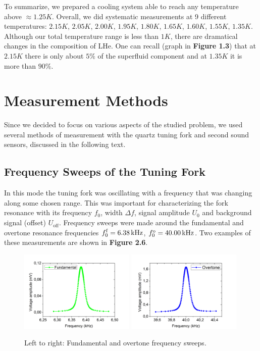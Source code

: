 To summarize, we prepared a cooling system able to reach any temperature above $ \approx 1.25\unit{K} $. Overall, we did systematic measurements at 9 different temperatures: $ 2.15\unit{K} $, $ 2.05\unit{K} $, $ 2.00\unit{K} $, $ 1.95\unit{K} $, $ 1.80\unit{K} $, $ 1.65\unit{K} $, $ 1.60\unit{K} $, $ 1.55\unit{K} $, $ 1.35\unit{K}$. Although our total temperature range is less than $ 1\unit{K} $, there are dramatical changes in the composition of LHe. One can recall (graph in {\sffamily\textbf{Figure 1.3}}) that at $ 2.15\unit{K} $ there is only about $ 5\% $ of the superfluid component and at $ 1.35 \unit{K} $ it is more than $ 90\% $.


\newpage
\section{Measurement Methods}

Since we decided to focus on various aspects of the studied problem, we used several methods of measurement with the quartz tuning fork and second sound sensors, discussed in the following text.

\subsection*{Frequency Sweeps of the Tuning Fork}

In this mode the tuning fork was oscillating with a frequency that was changing along some chosen range. This was important for characterizing the fork resonance with its frequency $ f_0 $, width $ \Delta f $, signal amplitude $ U_0 $ and background signal (offset) $ U_{\text{off}} $. Frequency sweeps were made around the fundamental and overtone resonance frequencies $ f_0^{\mathrm{f}} = 6.38\,\mathrm{kHz} $, $ f_0^{\mathrm{o}} = 40.00\,\mathrm{kHz} $. Two examples of these measurements are shown in {\sffamily\textbf{Figure 2.6}}.

\begin{figure}[h]
	\centering
	\includegraphics[width=0.49\textwidth]{graphs/TF_fund}
	\hfill
	\includegraphics[width=0.49\textwidth]{graphs/TF_over}
	\caption{Left to right: Fundamental and overtone frequency sweeps.}
\end{figure}

